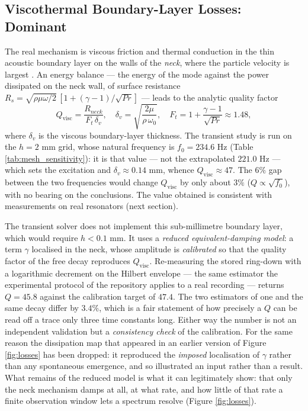 \documentclass[11pt,a4paper,twocolumn]{article}
\begin{document}
\subsection{Viscothermal Boundary-Layer Losses: Dominant}
The real mechanism is viscous friction and thermal conduction in the thin acoustic boundary layer on the walls of the \emph{neck}, where the particle velocity is largest \cite{crandall1926theory, morse1968theoretical}. An energy balance --- the energy of the mode against the power dissipated on the neck wall, of surface resistance $R_s=\sqrt{\rho\mu\omega/2}\,[1+(\gamma-1)/\sqrt{Pr}]$ --- leads to the analytic quality factor
\begin{equation}
\label{eq:Qvisc}
Q_{\mathrm{visc}} = \frac{R_{neck}}{F_t\,\delta_v}, \quad \delta_v=\sqrt{\frac{2\mu}{\rho\,\omega_0}}, \quad F_t = 1+\frac{\gamma-1}{\sqrt{Pr}}\approx 1.48,
\end{equation}
where $\delta_v$ is the viscous boundary-layer thickness. The transient study is run on the $h=2$ mm grid, whose natural frequency is $f_0 = 234.6\text{ Hz}$ (Table \ref{tab:mesh_sensitivity}): it is that value --- not the extrapolated $221.0$ Hz --- which sets the excitation and $\delta_v\approx0.14\text{ mm}$, whence $Q_{\mathrm{visc}}\approx47$. The $6\%$ gap between the two frequencies would change $Q_{\mathrm{visc}}$ by only about $3\%$ ($Q\propto\sqrt{f_0}$), with no bearing on the conclusions. The value obtained is consistent with measurements on real resonators (next section).

The transient solver does not implement this sub-millimetre boundary layer, which would require $h<0.1\text{ mm}$. It uses a \emph{reduced equivalent-damping model}: a term $\gamma$ localised in the neck, whose amplitude is \emph{calibrated} so that the quality factor of the free decay reproduces $Q_{\mathrm{visc}}$. Re-measuring the stored ring-down with a logarithmic decrement on the Hilbert envelope --- the same estimator the experimental protocol of the repository applies to a real recording --- returns $Q = 45.8$ against the calibration target of $47.4$. The two estimators of one and the same decay differ by $3.4\%$, which is a fair statement of how precisely a $Q$ can be read off a trace only three time constants long. Either way the number is not an independent validation but a \emph{consistency check} of the calibration. For the same reason the dissipation map that appeared in an earlier version of Figure \ref{fig:losses} has been dropped: it reproduced the \emph{imposed} localisation of $\gamma$ rather than any spontaneous emergence, and so illustrated an input rather than a result. What remains of the reduced model is what it can legitimately show: that only the neck mechanism damps at all, at what rate, and how little of that rate a finite observation window lets a spectrum resolve (Figure \ref{fig:losses}).
\end{document}
